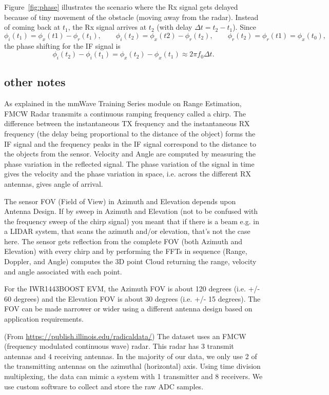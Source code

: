 \documentclass[11pt, oneside]{article}   	%
\begin{document}
Figure~\ref{fig:phase} illustrates the scenario where the Rx signal gets delayed because of tiny movement of the obstacle (moving away from the radar). Instead of coming back at $t_1$, the Rx signal arrives at $t_2$ (with delay $\Delta t = t_2 - t_1$).  Since
$$\phi_i(t_1) = \phi_x(t1) - \phi_r(t_1), \qquad \phi_i(t_2) = \phi_x(t2) - \phi_r(t_2), \qquad \phi_r(t_2) = \phi_r(t1) = \phi_x(t_0),$$
the phase shifting for the IF signal is
$$\phi_i(t_2)-\phi_i(t_1) = \phi_x(t_2) - \phi_x(t_1) \approx 2\pi f_0 \Delta t.$$


\subsection{other notes}

As explained in the mmWave Training Series module on Range Estimation, FMCW Radar transmits a continuous ramping frequency called a chirp. The difference between the instantaneous TX frequency and the instantaneous RX frequency (the delay being proportional to the distance of the object) forms the IF signal and the frequency peaks in the IF signal correspond to the distance to the objects from the sensor. Velocity and Angle are computed by measuring the phase variation in the reflected signal. The phase variation of the signal in time gives the velocity and the phase variation in space, i.e. across the different RX antennas, gives angle of arrival.

The sensor FOV (Field of View) in Azimuth and Elevation depends upon Antenna Design. If by sweep in Azimuth and Elevation (not to be confused with the frequency sweep of the chirp signal) you meant that if there is a beam e.g. in a LIDAR system, that scans the azimuth and/or elevation, that's not the case here. The sensor gets reflection from the complete FOV (both Azimuth and Elevation) with every chirp and by performing the FFTs in sequence (Range, Doppler, and Angle) computes the 3D point Cloud returning the range, velocity and angle associated with each point.

For the IWR1443BOOST EVM, the Azimuth FOV is about 120 degrees (i.e. +/- 60 degrees) and the Elevation FOV is about 30 degrees (i.e. +/- 15 degrees). The FOV can be made narrower or wider using a different antenna design based on application requirements.


(From \url{https://publish.illinois.edu/radicaldata/}) The dataset uses an FMCW (frequency modulated continuous wave) radar. This radar has 3 transmit antennas and 4 receiving antennas. In the majority of our data, we only use 2 of the transmitting antennas on the azimuthal (horizontal) axis. Using time division multiplexing, the data can mimic a system with 1 transmitter and 8 receivers. We use custom software to collect and store the raw ADC samples.
\end{document}
